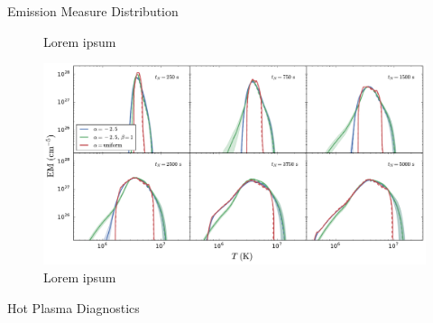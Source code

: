 \documentclass[final]{beamer}
\begin{document}
\begin{frame}
\begin{columns}[t]
\begin{column}{0.49\linewidth}
\begin{block}{Emission Measure Distribution}
\begin{figure}
        \caption{Lorem ipsum}
        \label{fig:electron_em}
      \end{figure}
      \begin{figure}
        \centering
        \includegraphics[width=\columnwidth]{figures/em_grid_ion_a25.pdf}
        \caption{Lorem ipsum}
        \label{fig:electron_em}
      \end{figure}
    \end{block}
    \begin{block}{Hot Plasma Diagnostics}
      \begin{figure}
        \centering
\end{figure}
\end{block}
\end{column}
\end{columns}
\end{frame}
\end{document}
